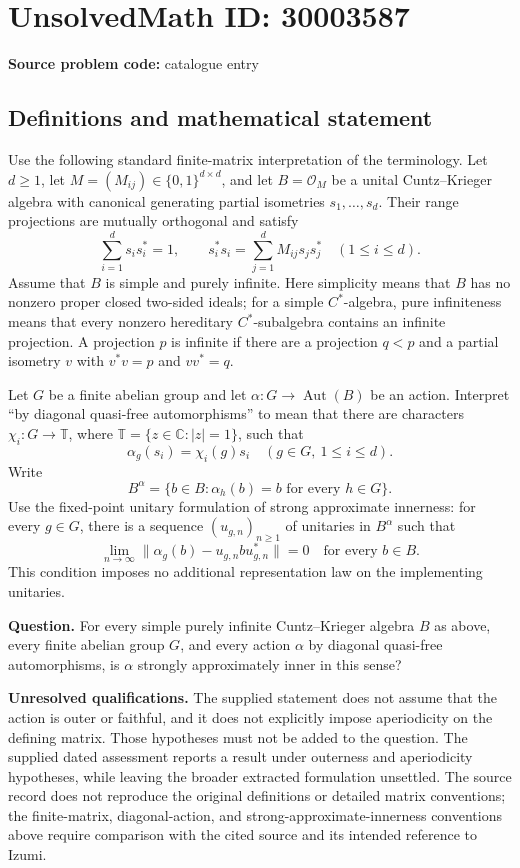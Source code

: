 \documentclass[11pt]{article}
\newcommand{\C}{\mathbb{C}}
\begin{document}
\section*{UnsolvedMath ID: 30003587}
\textbf{Source problem code:} catalogue entry
\subsection{Definitions and mathematical statement}
Use the following standard finite-matrix interpretation of the terminology. Let \(d\geq 1\), let \(M=(M_{ij})\in\{0,1\}^{d\times d}\), and let \(B=\mathcal O_M\) be a unital Cuntz--Krieger algebra with canonical generating partial isometries \(s_1,\ldots,s_d\). Their range projections are mutually orthogonal and satisfy
\[
\sum_{i=1}^{d}s_i s_i^*=1,
\qquad
s_i^*s_i=\sum_{j=1}^{d}M_{ij}s_j s_j^*
\quad(1\leq i\leq d).
\]
Assume that \(B\) is simple and purely infinite. Here simplicity means that \(B\) has no nonzero proper closed two-sided ideals; for a simple \(C^*\)-algebra, pure infiniteness means that every nonzero hereditary \(C^*\)-subalgebra contains an infinite projection. A projection \(p\) is infinite if there are a projection \(q<p\) and a partial isometry \(v\) with \(v^*v=p\) and \(vv^*=q\).

Let \(G\) be a finite abelian group and let \(\alpha:G\to\operatorname{Aut}(B)\) be an action. Interpret ``by diagonal quasi-free automorphisms'' to mean that there are characters \(\chi_i:G\to\mathbb T\), where \(\mathbb T=\{z\in\C:|z|=1\}\), such that
\[
\alpha_g(s_i)=\chi_i(g)s_i
\quad(g\in G,\ 1\leq i\leq d).
\]
Write
\[
B^\alpha=\{b\in B:\alpha_h(b)=b\text{ for every }h\in G\}.
\]
Use the fixed-point unitary formulation of strong approximate innerness: for every \(g\in G\), there is a sequence \((u_{g,n})_{n\geq1}\) of unitaries in \(B^\alpha\) such that
\[
\lim_{n\to\infty}\|\alpha_g(b)-u_{g,n}b u_{g,n}^*\|=0
\quad\text{for every }b\in B.
\]
This condition imposes no additional representation law on the implementing unitaries.

\textbf{Question.} For every simple purely infinite Cuntz--Krieger algebra \(B\) as above, every finite abelian group \(G\), and every action \(\alpha\) by diagonal quasi-free automorphisms, is \(\alpha\) strongly approximately inner in this sense?

\textbf{Unresolved qualifications.} The supplied statement does not assume that the action is outer or faithful, and it does not explicitly impose aperiodicity on the defining matrix. Those hypotheses must not be added to the question. The supplied dated assessment reports a result under outerness and aperiodicity hypotheses, while leaving the broader extracted formulation unsettled. The source record does not reproduce the original definitions or detailed matrix conventions; the finite-matrix, diagonal-action, and strong-approximate-innerness conventions above require comparison with the cited source and its intended reference to Izumi.
\end{document}
